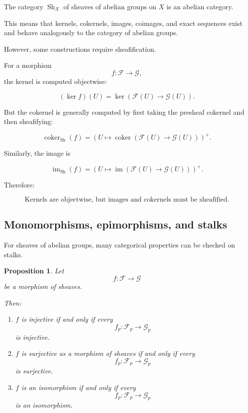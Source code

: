 \documentclass[12pt,a4paper]{article}
\newtheorem{proposition}{Proposition}[section]
\newcommand{\Sh}{\operatorname{Sh}}
\newcommand{\im}{\operatorname{im}}
\newcommand{\coker}{\operatorname{coker}}
\begin{document}
The category $\Sh_X$ of sheaves of abelian groups on $X$ is an abelian category.

This means that kernels, cokernels, images, coimages, and exact sequences exist
and behave analogously to the category of abelian groups.

However, some constructions require sheafification.

For a morphism
\[
f:\mathcal F\to\mathcal G,
\]
the kernel is computed objectwise:

\[
(\ker f)(U)
=
\ker
\left(
\mathcal F(U)\to\mathcal G(U)
\right).
\]

But the cokernel is generally computed by first taking the presheaf cokernel
and then sheafifying:

\[
\coker_{\Sh}(f)
=
\left(
U \longmapsto
\coker
\left(
\mathcal F(U)\to\mathcal G(U)
\right)
\right)^+.
\]

Similarly, the image is

\[
\im_{\Sh}(f)
=
\left(
U \longmapsto
\im
\left(
\mathcal F(U)\to\mathcal G(U)
\right)
\right)^+.
\]

Therefore:

\[
\boxed{
	\text{Kernels are objectwise, but images and cokernels must be sheafified.}
}
\]

\subsection{Monomorphisms, epimorphisms, and stalks}

For sheaves of abelian groups, many categorical properties can be checked on
stalks.

\begin{proposition}
	Let
	\[
	f:\mathcal F\to\mathcal G
	\]
	be a morphism of sheaves.
	
	Then:
	
	\begin{enumerate}
		\item $f$ is injective if and only if every
		\[
		f_p:\mathcal F_p\to\mathcal G_p
		\]
		is injective.
		
		\item $f$ is surjective as a morphism of sheaves if and only if every
		\[
		f_p:\mathcal F_p\to\mathcal G_p
		\]
		is surjective.
		
		\item $f$ is an isomorphism if and only if every
		\[
		f_p:\mathcal F_p\to\mathcal G_p
		\]
		is an isomorphism.
	\end{enumerate}
\end{proposition}
\end{document}
